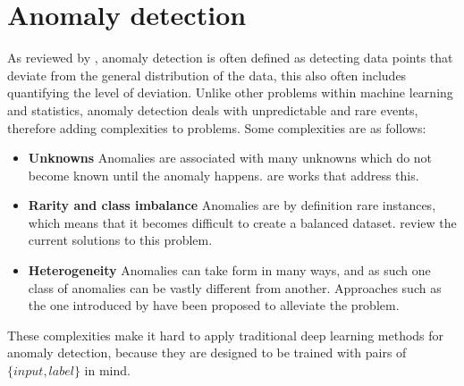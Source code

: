 \section{Anomaly detection}
\label{sec:anomaly_detection}
As reviewed by \textcite{anomaly_detection}, anomaly detection is often defined as detecting data points that deviate from the general distribution of the data, this also often includes quantifying the level of deviation. Unlike other problems within machine learning and statistics, anomaly detection deals with unpredictable and rare events, therefore adding complexities to problems. Some complexities are as follows:
\begin{itemize}
    \item \textbf{Unknowns} Anomalies are associated with many unknowns which do not become known until the anomaly happens. \textcite{unknown_detection1,unknown_detection2} are works that address this.
    \item \textbf{Rarity and class imbalance} Anomalies are by definition rare instances, which means that it becomes difficult to create a balanced dataset. \textcite{class_imbalance1} review the current solutions to this problem.
    \item \textbf{Heterogeneity} Anomalies can take form in many ways, and as such one class of anomalies can be vastly different from another. Approaches such as the one introduced by \textcite{heterogeneous1} have been proposed to alleviate the problem.
\end{itemize}
These complexities make it hard to apply traditional deep learning methods for anomaly detection, because they are designed to be trained with pairs of $\{input, label\}$ in mind.
